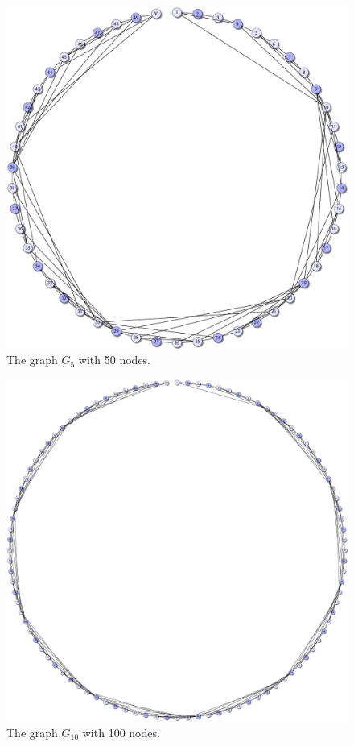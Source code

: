 \documentclass{article}
\begin{document}
\begin{figure}[ht]
  \centering
  \includegraphics[width=\textwidth]{figures/graph_050.pdf}
  \caption{The graph $G_{5}$ with 50 nodes.}
\end{figure}

\begin{figure}[ht]
  \centering
  \includegraphics[width=\textwidth]{figures/graph_100.pdf}
  \caption{The graph $G_{10}$ with 100 nodes.}
\end{figure}
\end{document}
